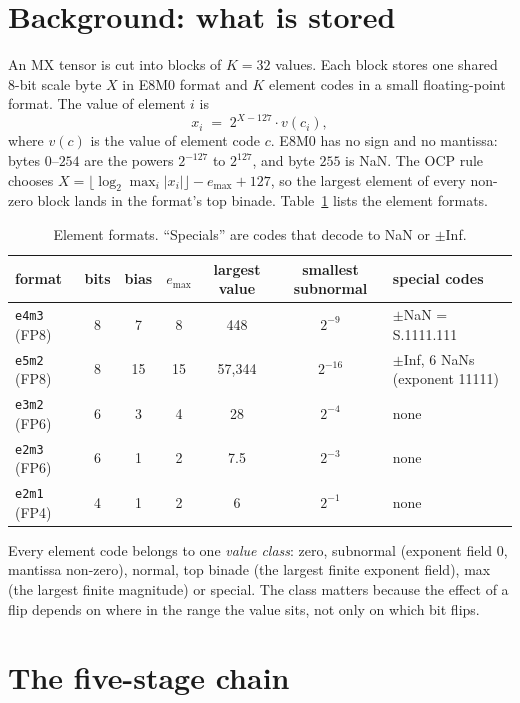 \documentclass[10pt,a4paper]{article}
\newcommand{\fmt}[1]{\texttt{#1}}
\begin{document}
\section{Background: what is stored}

An MX tensor is cut into blocks of $K=32$ values. Each block stores one shared 8-bit scale byte
$X$ in E8M0 format and $K$ element codes in a small floating-point format. The value of element
$i$ is
\[
  x_i \;=\; 2^{X-127}\cdot v(c_i),
\]
where $v(c)$ is the value of element code $c$. E8M0 has no sign and no mantissa: bytes $0$--$254$
are the powers $2^{-127}$ to $2^{127}$, and byte $255$ is NaN. The OCP rule chooses
$X = \lfloor\log_2 \max_i|x_i|\rfloor - e_{\max} + 127$, so the largest element of every
non-zero block lands in the format's top binade. Table~\ref{tab:formats} lists the element
formats.

\begin{table}[h]
\centering
\caption{Element formats. ``Specials'' are codes that decode to NaN or $\pm$Inf.}
\label{tab:formats}
\begin{tabular}{lcccccl}
\toprule
format & bits & bias & $e_{\max}$ & largest value & smallest subnormal & special codes \\
\midrule
\fmt{e4m3} (FP8) & 8 & 7  & 8  & 448    & $2^{-9}$  & $\pm$NaN = S.1111.111 \\
\fmt{e5m2} (FP8) & 8 & 15 & 15 & 57,344 & $2^{-16}$ & $\pm$Inf, 6 NaNs (exponent 11111) \\
\fmt{e3m2} (FP6) & 6 & 3  & 4  & 28     & $2^{-4}$  & none \\
\fmt{e2m3} (FP6) & 6 & 1  & 2  & 7.5    & $2^{-3}$  & none \\
\fmt{e2m1} (FP4) & 4 & 1  & 2  & 6      & $2^{-1}$  & none \\
\bottomrule
\end{tabular}
\end{table}

Every element code belongs to one \emph{value class}: zero, subnormal (exponent field 0, mantissa
non-zero), normal, top binade (the largest finite exponent field), max (the largest finite
magnitude) or special. The class matters because the effect of a flip depends on where in the
range the value sits, not only on which bit flips.

\section{The five-stage chain}
\end{document}
